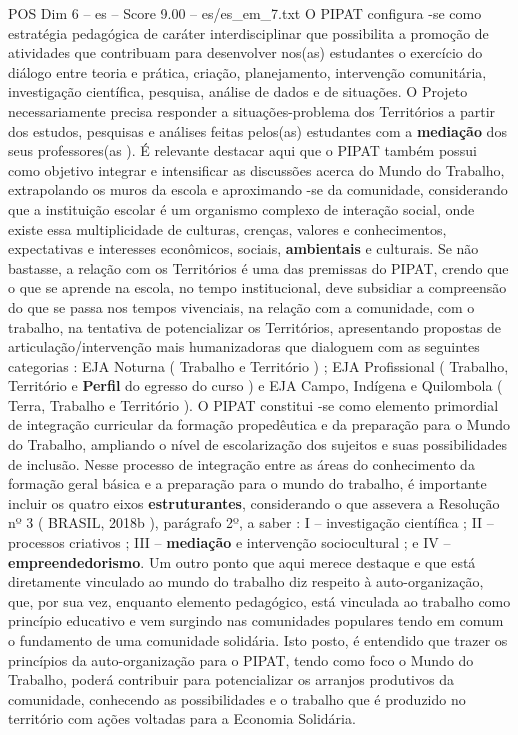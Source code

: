 \begin{textsample}{POS Dim 6 – es – Score 9.00 – es/es\_em\_7.txt}
O PIPAT configura -se como estratégia pedagógica de caráter interdisciplinar que possibilita a promoção de atividades que contribuam para desenvolver nos(as) estudantes o exercício do diálogo entre teoria e prática, criação, planejamento, intervenção comunitária, investigação científica, pesquisa, análise de dados e de situações.
O Projeto necessariamente precisa responder a situações-problema dos Territórios a partir dos estudos, pesquisas e análises feitas pelos(as) estudantes com a \textbf{mediação} dos seus professores(as ).
É relevante destacar aqui que o PIPAT também possui como objetivo integrar e intensificar as discussões acerca do Mundo do Trabalho, extrapolando os muros da escola e aproximando -se da comunidade, considerando que a instituição escolar é um organismo complexo de interação social, onde existe essa multiplicidade de culturas, crenças, valores e conhecimentos, expectativas e interesses econômicos, sociais, \textbf{ambientais} e culturais.
Se não bastasse, a relação com os Territórios é uma das premissas do PIPAT, crendo que o que se aprende na escola, no tempo institucional, deve subsidiar a compreensão do que se passa nos tempos vivenciais, na relação com a comunidade, com o trabalho, na tentativa de potencializar os Territórios, apresentando propostas de articulação/intervenção mais humanizadoras que dialoguem com as seguintes categorias : EJA Noturna ( Trabalho e Território ) ; EJA Profissional ( Trabalho, Território e \textbf{Perfil} do egresso do curso ) e EJA Campo, Indígena e Quilombola ( Terra, Trabalho e Território ).
O PIPAT constitui -se como elemento primordial de integração curricular da formação propedêutica e da preparação para o Mundo do Trabalho, ampliando o nível de escolarização dos sujeitos e suas possibilidades de inclusão.
Nesse processo de integração entre as áreas do conhecimento da formação geral básica e a preparação para o mundo do trabalho, é importante incluir os quatro eixos \textbf{estruturantes}, considerando o que assevera a Resolução nº 3 ( BRASIL, 2018b ), parágrafo 2º, a saber : I – investigação científica ; II – processos criativos ; III – \textbf{mediação} e intervenção sociocultural ; e IV – \textbf{empreendedorismo}.
Um outro ponto que aqui merece destaque e que está diretamente vinculado ao mundo do trabalho diz respeito à auto-organização, que, por sua vez, enquanto elemento pedagógico, está vinculada ao trabalho como princípio educativo e vem surgindo nas comunidades populares tendo em comum o fundamento de uma comunidade solidária.
Isto posto, é entendido que trazer os princípios da auto-organização para o PIPAT, tendo como foco o Mundo do Trabalho, poderá contribuir para potencializar os arranjos produtivos da comunidade, conhecendo as possibilidades e o trabalho que é produzido no território com ações voltadas para a Economia Solidária.

\end{textsample}
